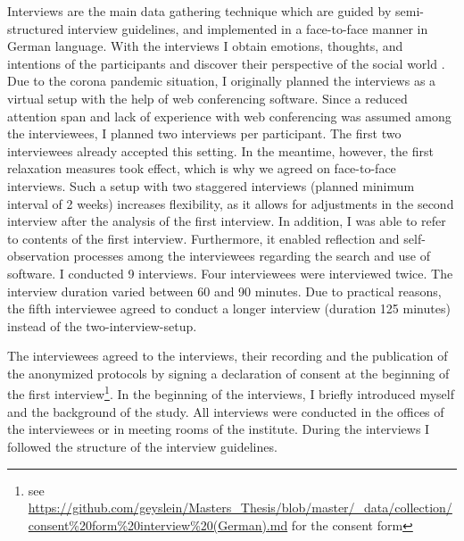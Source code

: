 \documentclass[12pt, a4paper, titlepage, oneside, abstract=true, toc=listof, toc=bibliography]{scrreprt}
\begin{document}
Interviews are the main data gathering technique which are guided by semi-structured interview guidelines, and implemented in a face-to-face manner \citep{Bryman2004} in German language. With the interviews I obtain emotions, thoughts, and intentions of the participants and discover their perspective of the social world \citep{Patton2002}. Due to the corona pandemic situation, I originally planned the interviews as a virtual setup with the help of web conferencing software. Since a reduced attention span and lack of experience with web conferencing was assumed among the interviewees, I planned two interviews per participant. The first two interviewees already accepted this setting. In the meantime, however, the first relaxation measures took effect, which is why we agreed on face-to-face interviews. Such a setup with two staggered interviews (planned minimum interval of 2 weeks) increases flexibility, as it allows for adjustments in the second interview after the analysis of the first interview. In addition, I was able to refer to contents of the first interview. Furthermore, it enabled reflection and self-observation processes among the interviewees regarding the search and use of software. I conducted 9 interviews. Four interviewees were interviewed twice. The interview duration varied between 60 and 90 minutes. Due to practical reasons, the fifth interviewee agreed to conduct a longer interview (duration 125 minutes) instead of the two-interview-setup.

The interviewees agreed to the interviews, their recording and the publication of the anonymized protocols by signing a declaration of consent at the beginning of the first interview\footnote{see \url{https://github.com/geyslein/Masters_Thesis/blob/master/_data/collection/consent\%20form\%20interview\%20(German).md} for the consent form}. In the beginning of the interviews, I briefly introduced myself and the background of the study. All interviews were conducted in the offices of the interviewees or in meeting rooms of the institute. During the interviews I followed the structure of the interview guidelines.
\end{document}

